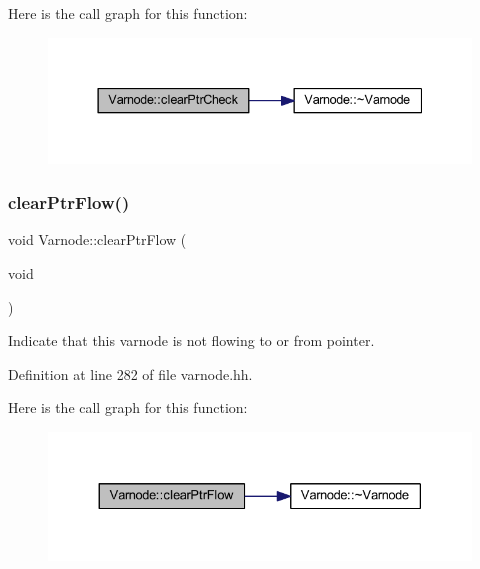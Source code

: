 Here is the call graph for this function\+:
\nopagebreak
\begin{figure}[H]
\begin{center}
\leavevmode
\includegraphics[width=337pt]{class_varnode_a2a4392f973d2f0dc1fb79d4bc6f3a37d_cgraph}
\end{center}
\end{figure}
\mbox{\label{class_varnode_a72d8cb796a18e58c81280445e29c300b}} 
\subsubsection{\texorpdfstring{clearPtrFlow()}{clearPtrFlow()}}
{\footnotesize\ttfamily void Varnode\+::clear\+Ptr\+Flow (\begin{DoxyParamCaption}\item[{void}]{ }\end{DoxyParamCaption})\hspace{0.3cm}{\ttfamily [inline]}}



Indicate that this varnode is not flowing to or from pointer. 



Definition at line 282 of file varnode.\+hh.

Here is the call graph for this function\+:
\nopagebreak
\begin{figure}[H]
\begin{center}
\leavevmode
\includegraphics[width=330pt]{class_varnode_a72d8cb796a18e58c81280445e29c300b_cgraph}
\end{center}
\end{figure}
\mbox{\label{class_varnode_ad4d387ef43c2d52914b52bc428ba436b}} 

